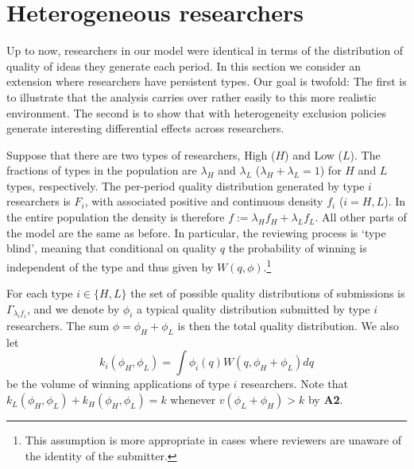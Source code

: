 \documentclass[12pt]{article}
\theoremstyle{plain}
\theoremstyle{definition}
\theoremstyle{remark}
\begin{document}


\section{Heterogeneous researchers}\label{sec-heterogenous}


Up to now, researchers in our model were identical in terms of the distribution of quality of ideas they generate each period. In this section we consider an extension where researchers have persistent types. Our goal is twofold: The first is to illustrate that the analysis carries over rather easily to this more realistic environment. The second is to show that with heterogeneity exclusion policies generate interesting differential effects across researchers.   

Suppose that there are two types of researchers, High ($H$) and Low ($L$). The fractions of types in the population are $\lambda_H$ and $\lambda_L$ ($\lambda_H+\lambda_L=1$) for $H$ and $L$ types, respectively. The per-period quality distribution generated by type $i$ researchers is $F_i$, with associated positive and continuous density $f_i$ ($i=H,L$). In the entire population the density is therefore $f:=\lambda_Hf_H+\lambda_Lf_L$. All other parts of the model are the same as before. In particular, the reviewing process is `type blind', meaning that conditional on quality $q$ the probability of winning is independent of the type and thus given by $W(q,\phi)$.\footnote{This assumption is more appropriate in cases where reviewers are unaware of the identity of the submitter.} %

For each type $i\in \{H,L\}$ the set of possible quality distributions of submissions is $\Gamma_{\lambda_i f_i}$, and we denote by $\phi_i$ a typical quality distribution submitted by type $i$ researchers. The sum $\phi=\phi_H+\phi_L$ is then the total quality distribution. We also let 
$$k_i(\phi_H,\phi_L) = \int \phi_i(q) W(q,\phi_H+\phi_L)dq$$
be the volume of winning applications of type $i$ researchers. Note that $k_L(\phi_H,\phi_L)+k_H(\phi_H,\phi_L)=k$ whenever $v(\phi_L+\phi_H)>k$ by \textbf{A2}. 
\end{document}
